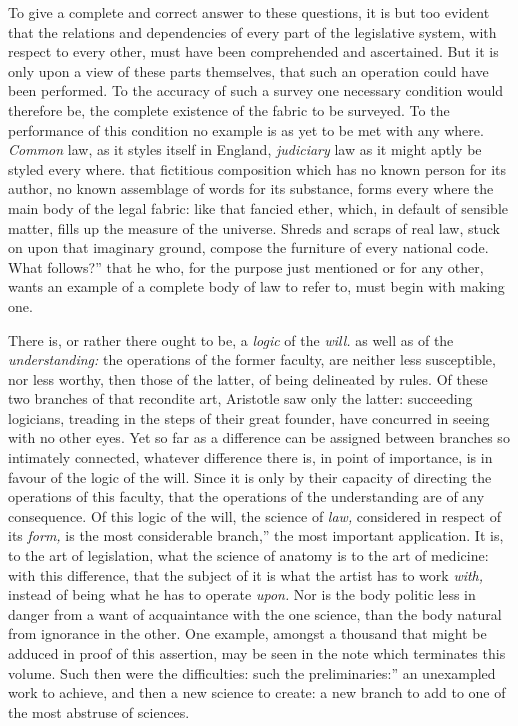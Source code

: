 \documentclass[12pt]{report}
\begin{document}
To give a complete and correct answer to these questions, it is but too
evident that the relations and dependencies of every part of the
legislative system, with respect to every other, must have been
comprehended and ascertained. But it is only upon a view of these parts
themselves, that such an operation could have been performed. To the
accuracy of such a survey one necessary condition would therefore be,
the complete existence of the fabric to be surveyed. To the performance
of this condition no example is as yet to be met with any where.
\emph{Common} law, as it styles itself in England, \emph{judiciary} law
as it might aptly be styled every where. that fictitious composition
which has no known person for its author, no known assemblage of words
for its substance, forms every where the main body of the legal fabric:
like that fancied ether, which, in default of sensible matter, fills up
the measure of the universe. Shreds and scraps of real law, stuck on
upon that imaginary ground, compose the furniture of every national
code. What follows?'' that he who, for the purpose just
mentioned or for any other, wants an example of a complete body of law
to refer to, must begin with making one.

There is, or rather there ought to be, a \emph{logic} of the
\emph{will.} as well as of the \emph{understanding:} the operations of
the former faculty, are neither less susceptible, nor less worthy, then
those of the latter, of being delineated by rules. Of these two branches
of that recondite art, Aristotle saw only the latter: succeeding
logicians, treading in the steps of their great founder, have concurred
in seeing with no other eyes. Yet so far as a difference can be assigned
between branches so intimately connected, whatever difference there is,
in point of importance, is in favour of the logic of the will. Since it
is only by their capacity of directing the operations of this faculty,
that the operations of the understanding are of any consequence. Of this
logic of the will, the science of \emph{law,} considered in respect of
its \emph{form,} is the most considerable branch,'' the most
important application. It is, to the art of legislation, what the
science of anatomy is to the art of medicine: with this difference, that
the subject of it is what the artist has to work \emph{with,} instead of
being what he has to operate \emph{upon.} Nor is the body politic less
in danger from a want of acquaintance with the one science, than the
body natural from ignorance in the other. One example, amongst a
thousand that might be adduced in proof of this assertion, may be seen
in the note which terminates this volume. Such then were the
difficulties: such the preliminaries:'' an unexampled work to
achieve, and then a new science to create: a new branch to add to one of
the most abstruse of sciences.
\end{document}
